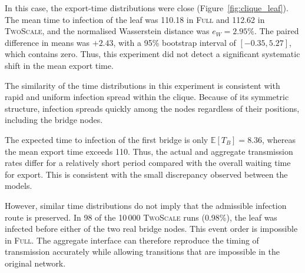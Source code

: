 \documentclass[a4paper,fleqn]{cas-sc}
\newcommand{\Full}{\textup{\textsc{Full}}}
\newcommand{\TS}{\textup{\textsc{TwoScale}}}
\newcommand{\eW}{e_{W}}
\begin{document}
In this case, the export-time distributions were close (Figure~\ref{fig:clique_leaf}). The mean time to infection of the leaf was 110.18 in \Full{} and 112.62 in \TS{}, and the normalised Wasserstein distance was $\eW=2.95\%$. The paired difference in means was $+2.43$, with a 95\% bootstrap interval of $[-0.35,5.27]$, which contains zero. Thus, this experiment did not detect a significant systematic shift in the mean export time.

The similarity of the time distributions in this experiment is consistent with rapid and uniform infection spread within the clique. Because of its symmetric structure, infection spreads quickly among the nodes regardless of their positions, including the bridge nodes.

The expected time to infection of the first bridge is only $\mathbb{E}[T_B]=8.36$, whereas the mean export time exceeds 110. Thus, the actual and aggregate transmission rates differ for a relatively short period compared with the overall waiting time for export. This is consistent with the small discrepancy observed between the models.

However, similar time distributions do not imply that the admissible infection route is preserved. In 98 of the 10\,000 \TS{} runs (0.98\%), the leaf was infected before either of the two real bridge nodes. This event order is impossible in \Full{}. The aggregate interface can therefore reproduce the timing of transmission accurately while allowing transitions that are impossible in the original network.
\end{document}
